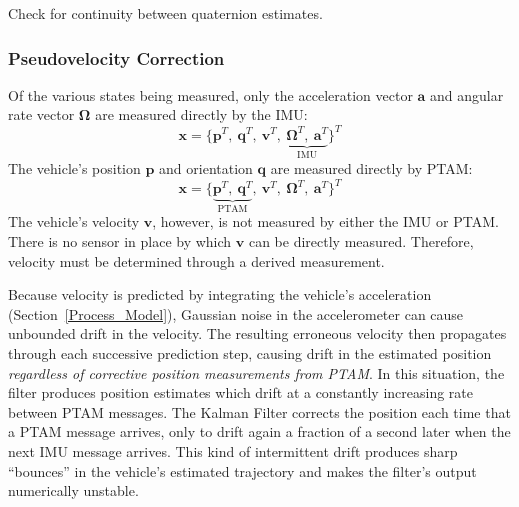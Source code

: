 \begin{algorithm}
  \caption{Check for continuity between quaternion estimates.}
    \label{alg:checkQuatContinuity}
\end{algorithm}

\subsubsection{Pseudovelocity Correction}

Of the various states being measured, only the acceleration vector $$ and angular rate vector $\bm{\Omega}$ are measured directly by the IMU:
%
\begin{equation*}
\mathbf{x} = 
\Big\{   
    \mathbf{p}^{T},\
    \mathbf{q}^{T},\
    \mathbf{v}^{T},\
    \underbrace{
    \bm{\Omega}^{T},\
    \mathbf{a}^{T}}_{\text{IMU}}
\Big\} ^{T}
\end{equation*}
%
The vehicle's position $$ and orientation $$ are measured directly by PTAM:
%
\begin{equation*}
\mathbf{x} = 
\Big\{
\underbrace{
    \mathbf{p}^{T},\
    \mathbf{q}^{T}}_{\text{PTAM}},\
    ^{T},\
    \bm{\Omega}^{T},\
    \mathbf{a}^{T}
\Big\} ^{T}
\end{equation*}
%
The vehicle's velocity $$, however, is not measured by either the IMU or PTAM. There is no sensor in place by which $\mathbf{v}$ can be directly measured. Therefore, velocity must be determined through a derived measurement.

Because velocity is predicted by integrating the vehicle's acceleration (Section~\ref{Process_Model}), Gaussian noise in the accelerometer can cause unbounded drift in the velocity. The resulting erroneous velocity then propagates through each successive prediction step, causing drift in the estimated position \textit{regardless of corrective position measurements from PTAM}. In this situation, the filter produces position estimates which drift at a constantly increasing rate between PTAM messages. The Kalman Filter corrects the position each time that a PTAM message arrives, only to drift again a fraction of a second later when the next IMU message arrives. This kind of intermittent drift produces sharp ``bounces'' in the vehicle's estimated trajectory and makes the filter's output numerically unstable.

